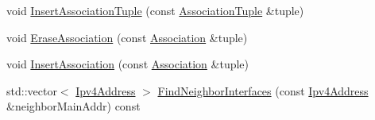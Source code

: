 \begin{DoxyCompactItemize}
\item 
void \hyperlink{classns3_1_1olsr_1_1OlsrState_acee0d3280a41c1eba08ec454adfef3c5}{Insert\+Association\+Tuple} (const \hyperlink{structns3_1_1olsr_1_1AssociationTuple}{Association\+Tuple} \&tuple)
\item 
void \hyperlink{classns3_1_1olsr_1_1OlsrState_a10d846d1a722985ed3c98d2f1ab5316a}{Erase\+Association} (const \hyperlink{structns3_1_1olsr_1_1Association}{Association} \&tuple)
\item 
void \hyperlink{classns3_1_1olsr_1_1OlsrState_a4cdfceadaf69dda63b8fbe08d4ba5acc}{Insert\+Association} (const \hyperlink{structns3_1_1olsr_1_1Association}{Association} \&tuple)
\item 
std\+::vector$<$ \hyperlink{classns3_1_1Ipv4Address}{Ipv4\+Address} $>$ \hyperlink{classns3_1_1olsr_1_1OlsrState_a90204c0096fb66ea3f41a3e530f4befe}{Find\+Neighbor\+Interfaces} (const \hyperlink{classns3_1_1Ipv4Address}{Ipv4\+Address} \&neighbor\+Main\+Addr) const 
\end{DoxyCompactItemize}
